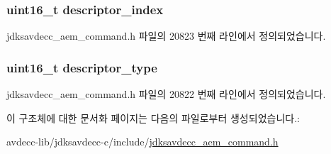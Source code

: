 \subsubsection[{\texorpdfstring{descriptor\+\_\+index}{descriptor_index}}]{\setlength{\rightskip}{0pt plus 5cm}uint16\+\_\+t descriptor\+\_\+index}\hypertarget{structjdksavdecc__aem__command__get__mixer_a042bbc76d835b82d27c1932431ee38d4}{}\label{structjdksavdecc__aem__command__get__mixer_a042bbc76d835b82d27c1932431ee38d4}


jdksavdecc\+\_\+aem\+\_\+command.\+h 파일의 20823 번째 라인에서 정의되었습니다.

\subsubsection[{\texorpdfstring{descriptor\+\_\+type}{descriptor_type}}]{\setlength{\rightskip}{0pt plus 5cm}uint16\+\_\+t descriptor\+\_\+type}\hypertarget{structjdksavdecc__aem__command__get__mixer_ab7c32b6c7131c13d4ea3b7ee2f09b78d}{}\label{structjdksavdecc__aem__command__get__mixer_ab7c32b6c7131c13d4ea3b7ee2f09b78d}


jdksavdecc\+\_\+aem\+\_\+command.\+h 파일의 20822 번째 라인에서 정의되었습니다.



이 구조체에 대한 문서화 페이지는 다음의 파일로부터 생성되었습니다.\+:\begin{DoxyCompactItemize}
\item 
avdecc-\/lib/jdksavdecc-\/c/include/\hyperlink{jdksavdecc__aem__command_8h}{jdksavdecc\+\_\+aem\+\_\+command.\+h}\end{DoxyCompactItemize}
